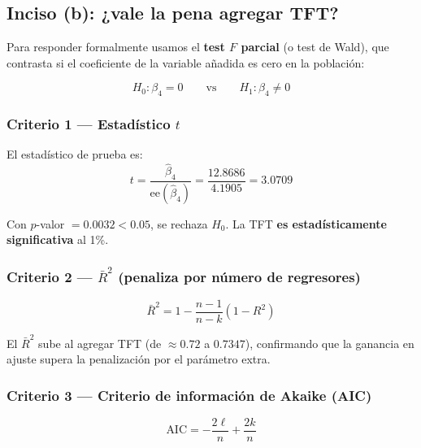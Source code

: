 \documentclass[12pt, letterpaper]{article}
\begin{document}
\subsection{Inciso (b): ¿vale la pena agregar TFT?}

Para responder formalmente usamos el \textbf{test $F$ parcial} (o test de
Wald), que contrasta si el coeficiente de la variable añadida es cero en
la población:

\begin{equation}
  H_0: \beta_4 = 0 \qquad \text{vs} \qquad H_1: \beta_4 \neq 0
  \label{eq:hipotesis_b}
\end{equation}

\subsubsection{Criterio 1 — Estadístico $t$}

El estadístico de prueba es:
\begin{equation}
  t = \frac{\hat{\beta}_4}{\text{ee}(\hat{\beta}_4)}
    = \frac{12.8686}{4.1905}
    = 3.0709
  \label{eq:t_TFT}
\end{equation}

\noindent Con $p$-valor $= 0.0032 < 0.05$, se rechaza $H_0$. La TFT
\textbf{es estadísticamente significativa} al 1\%.

\subsubsection{Criterio 2 — $\bar{R}^2$ (penaliza por número de regresores)}

\begin{equation}
  \bar{R}^2 = 1 - \frac{n-1}{n-k}\left(1 - R^2\right)
  \label{eq:R2adj}
\end{equation}

\noindent El $\bar{R}^2$ sube al agregar TFT (de $\approx 0.72$ a $0.7347$),
confirmando que la ganancia en ajuste supera la penalización por el parámetro
extra.

\subsubsection{Criterio 3 — Criterio de información de Akaike (AIC)}

\begin{equation}
  \text{AIC} = -\frac{2\ell}{n} + \frac{2k}{n}
  \label{eq:AIC}
\end{equation}
\end{document}
